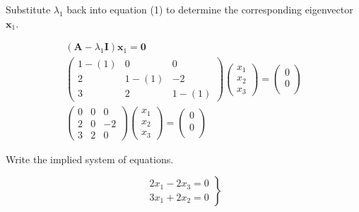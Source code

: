 \documentclass[12pt]{article}
\begin{document}
Substitute \(\lambda_{1}\) back into equation (1) to determine the corresponding
eigenvector \(\mathbf{x}_{1}\). 

\begin{equation*}
	\begin{array}{c}
		\left(\mathbf{A}-\lambda_{1} \mathbf{I}\right) \mathbf{x}_{1}=\mathbf{0}                                            \\
		\left(\begin{array}{ccc}
				1-(1) & 0     & 0     \\
				2     & 1-(1) & -2    \\
				3     & 2     & 1-(1)
			\end{array}\right)\left(\begin{array}{l}
				x_{1} \\
				x_{2} \\
				x_{3}
			\end{array}\right)=\left(\begin{array}{c}
				0 \\
				0 \\

			\end{array}\right) \\
		\left(\begin{array}{ccc}
				0 & 0 & 0  \\
				2 & 0 & -2 \\
				3 & 2 & 0
			\end{array}\right)\left(\begin{array}{l}
				x_{1} \\
				x_{2} \\
				x_{3}
			\end{array}\right)=\left(\begin{array}{l}
				0 \\
				0 \\

			\end{array}\right)
	\end{array}
\end{equation*}

Write the implied system of equations.

\begin{equation*}
	\left.\begin{array}{l}
		2 x_{1}-2 x_{3}=0 \\
		3 x_{1}+2 x_{2}=0
	\end{array}\right\}
\end{equation*}
\end{document}

